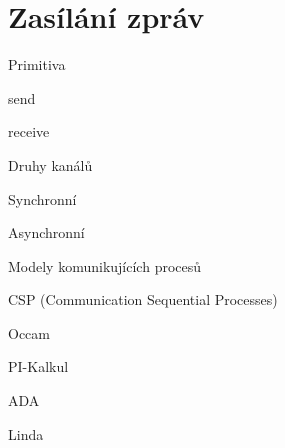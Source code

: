 
\section{Zasílání zpráv}

\begin{compactitem}
    \item Primitiva \begin{compactitem}
        \item send
        \item receive
    \end{compactitem}

    \item Druhy kanálů \begin{compactitem}
        \item Synchronní
        \item Asynchronní
    \end{compactitem}

    \item Modely komunikujících procesů \begin{compactitem}
        \item CSP (Communication Sequential Processes)
        \item Occam
        \item PI-Kalkul
        \item ADA
        \item Linda
    \end{compactitem}
\end{compactitem}
